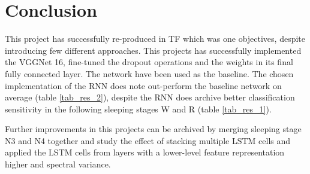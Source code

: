 \section{Conclusion}
\label{sec:conclusion}

This project has successfully re-produced \cite{main_ar} in TF which was one objectives, despite introducing few different approaches. 
This projects has successfully implemented the VGGNet 16, fine-tuned the dropout operations and the weights in its final fully connected layer. The network have been used as the baseline. The chosen implementation of the RNN does note out-perform the baseline network on average (table \ref{tab_res_2}), despite the RNN does archive better classification sensitivity in the following sleeping stages W and R (table \ref{tab_res_1}). 

Further improvements in this projects can be archived by merging sleeping stage N3 and N4 together and study the effect of stacking multiple LSTM cells and applied the LSTM cells from layers with a lower-level feature representation higher and spectral variance.